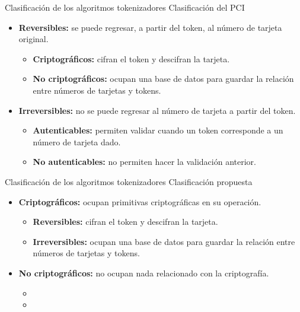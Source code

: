 \documentclass{beamer}
\begin{document}
  \begin{frame}{Clasificación de los algoritmos tokenizadores}
    {Clasificación del PCI \cite{pci_tokens}}
    \begin{itemize}
      \item \textbf{Reversibles:} se puede regresar, a partir del token, al
        número de tarjeta original.
        \begin{itemize}
          \item \textbf{Criptográficos:} cifran el token y descifran la
            tarjeta.
          \item \textbf{No criptográficos:} ocupan una base de datos para
            guardar la relación entre números de tarjetas y tokens.
        \end{itemize}
      \item \textbf{Irreversibles:} no se puede regresar al número de tarjeta a
        partir del token.
        \begin{itemize}
          \item \textbf{Autenticables:} permiten validar cuando un token
            corresponde a un número de tarjeta dado.
          \item \textbf{No autenticables:} no permiten hacer la validación
            anterior.
        \end{itemize}
    \end{itemize}
  \end{frame}

  \begin{frame}{Clasificación de los algoritmos tokenizadores}
    {Clasificación propuesta}
    \begin{itemize}
      \item \textbf{Criptográficos:} ocupan primitivas criptográficas en su
        operación.
      \begin{itemize}
        \item \textbf{Reversibles:} cifran el token y descifran la
          tarjeta.
        \item \textbf{Irreversibles:} ocupan una base de datos para
          guardar la relación entre números de tarjetas y tokens.
      \end{itemize}
      \item \textbf{No criptográficos:} no ocupan nada relacionado con la
          criptografía.
      \begin{itemize}
        \item[]
        \item[]
      \end{itemize}
    \end{itemize}
  \end{frame}
\end{document}
